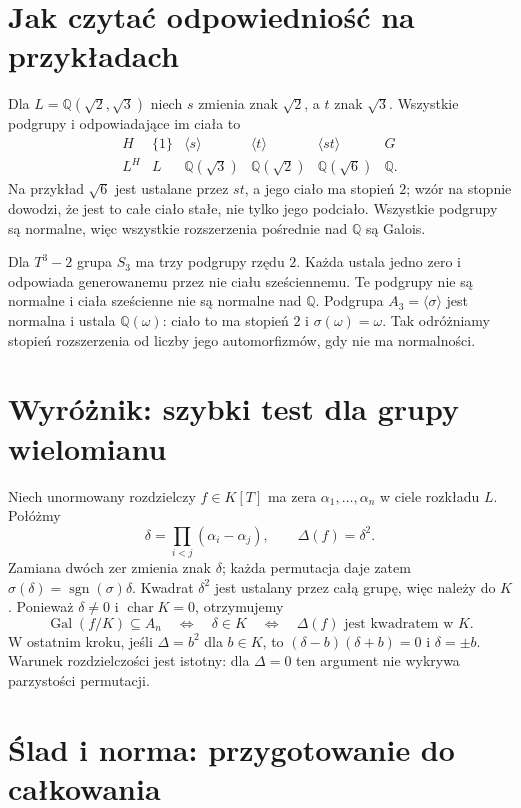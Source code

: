 \documentclass[11pt,a4paper,oneside]{book}
\numberwithin{equation}{section}
\theoremstyle{plain}
\theoremstyle{definition}
\theoremstyle{remark}
\newcommand{\Q}{\mathbb{Q}}
\newcommand{\Gal}{\operatorname{Gal}}
\newcommand{\charac}{\operatorname{char}}
\begin{document}
\section{Jak czytać odpowiedniość na przykładach}

Dla $L=\Q(\sqrt2,\sqrt3)$ niech $s$ zmienia znak $\sqrt2$, a $t$ znak $\sqrt3$. Wszystkie podgrupy i odpowiadające im ciała to
\[
\begin{array}{c|ccccc}
H & \{1\} & \langle s\rangle & \langle t\rangle & \langle st\rangle & G\\ \hline
L^H & L & \Q(\sqrt3) & \Q(\sqrt2) & \Q(\sqrt6) & \Q.
\end{array}
\]
Na przykład $\sqrt6$ jest ustalane przez $st$, a jego ciało ma stopień $2$; wzór na stopnie dowodzi, że jest to całe ciało stałe, nie tylko jego podciało. Wszystkie podgrupy są normalne, więc wszystkie rozszerzenia pośrednie nad $\Q$ są Galois.

Dla $T^3-2$ grupa $S_3$ ma trzy podgrupy rzędu $2$. Każda ustala jedno zero i odpowiada generowanemu przez nie ciału sześciennemu. Te podgrupy nie są normalne i ciała sześcienne nie są normalne nad $\Q$. Podgrupa $A_3=\langle\sigma\rangle$ jest normalna i ustala $\Q(\omega)$: ciało to ma stopień $2$ i $\sigma(\omega)=\omega$. Tak odróżniamy stopień rozszerzenia od liczby jego automorfizmów, gdy nie ma normalności.

\section{Wyróżnik: szybki test dla grupy wielomianu}

Niech unormowany rozdzielczy $f\in K[T]$ ma zera $\alpha_1,\dots,\alpha_n$ w ciele rozkładu $L$. Połóżmy
\[
\delta=\prod_{i<j}(\alpha_i-\alpha_j),\qquad \Delta(f)=\delta^2.
\]
Zamiana dwóch zer zmienia znak $\delta$; każda permutacja daje zatem $\sigma(\delta)=\operatorname{sgn}(\sigma)\delta$. Kwadrat $\delta^2$ jest ustalany przez całą grupę, więc należy do $K$. Ponieważ $\delta\ne0$ i $\charac K=0$, otrzymujemy
\[
\Gal(f/K)\subseteq A_n\quad\Longleftrightarrow\quad \delta\in K
\quad\Longleftrightarrow\quad \Delta(f)\text{ jest kwadratem w }K.
\]
W ostatnim kroku, jeśli $\Delta=b^2$ dla $b\in K$, to $(\delta-b)(\delta+b)=0$ i $\delta=\pm b$. Warunek rozdzielczości jest istotny: dla $\Delta=0$ ten argument nie wykrywa parzystości permutacji.

\section{Ślad i norma: przygotowanie do całkowania}
\end{document}
